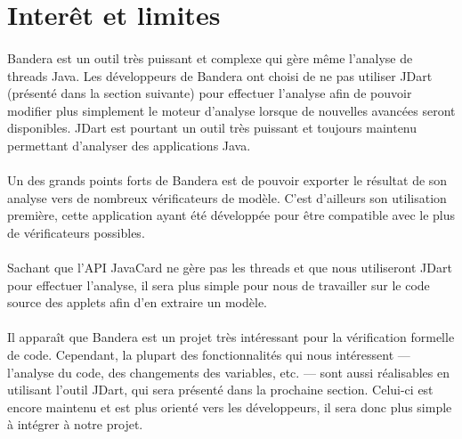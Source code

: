 \section{Interêt et limites}

\paragraph{}
Bandera est un outil très puissant et complexe qui gère même l'analyse
de threads Java. Les développeurs de Bandera ont choisi de ne pas
utiliser JDart (présenté dans la section suivante) pour effectuer
l'analyse afin de pouvoir modifier plus simplement le moteur d'analyse
lorsque de nouvelles avancées seront disponibles. JDart est pourtant
un outil très puissant et toujours maintenu permettant d'analyser des
applications Java.

\paragraph{}
Un des grands points forts de Bandera est de pouvoir exporter le
résultat de son analyse vers de nombreux vérificateurs de
modèle. C'est d'ailleurs son utilisation première, cette application
ayant été développée pour être compatible avec le plus de
vérificateurs possibles.

\paragraph{}
Sachant que l'API JavaCard ne gère pas les threads et que nous
utiliseront JDart pour effectuer l'analyse, il sera plus simple pour
nous de travailler sur le code source des applets afin d'en extraire
un modèle.

\paragraph{}
Il apparaît que Bandera est un projet très intéressant pour la
vérification formelle de code. Cependant, la plupart des
fonctionnalités qui nous intéressent --- l'analyse du code, des
changements des variables, etc. --- sont aussi réalisables en
utilisant l'outil JDart, qui sera présenté dans la prochaine
section. Celui-ci est encore maintenu et est plus orienté vers les
développeurs, il sera donc plus simple à intégrer à notre projet.
